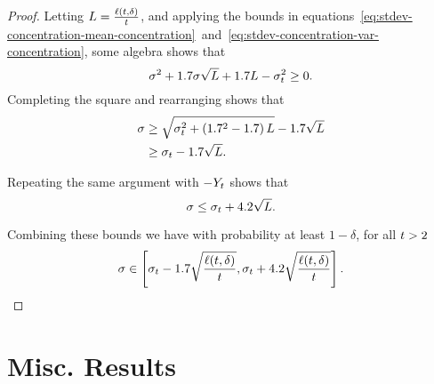 \begin{proof}
    Letting \(L = \frac{\ell(t, \delta)}{t}\), and applying the bounds in equations~\eqref{eq:stdev-concentration-mean-concentration}~and~\ref{eq:stdev-concentration-var-concentration}, some algebra shows that
    \begin{equation}
        \sigma^2 + 1.7 \sigma \sqrt{L} + 1.7 L - \sigma^{2}_{t} \geq 0.
    \end{equation}
    Completing the square and rearranging shows that
    \begin{align}
        \sigma 
            &\geq \sqrt{\sigma^{2}_{t} + \left( 1.7^2 - 1.7 \right)L} - 1.7 \sqrt{L} \\
            &\geq \sigma_{t} - 1.7 \sqrt{L}.
    \end{align}
    
   Repeating the same argument with $-Y_{t}$ shows that
    \begin{equation}
        \sigma \leq \sigma_{t} + 4.2 \sqrt{L}.
    \end{equation}

    Combining these bounds we have with probability at least $1 - \delta$, for all $t > 2$
    \begin{equation}
        \stdev \in \sbrk{\sigma_\round - 1.7 \sqrt{\frac{\ell(\round, \errorProb)}{\round}}, \sigma_\round + 4.2 \sqrt{\frac{\ell(\round, \errorProb)}{\round}}}.
    \end{equation}
    
\end{proof}


\section{Misc. Results}

